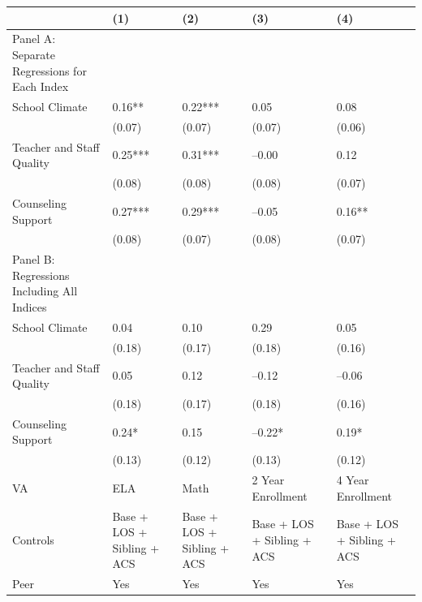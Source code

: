 \documentclass{article}
\begin{document}
\begin{table}[tbp] \centering
{}

{\footnotesize
\begin{tabularx}{\linewidth}{lCCCC}

\toprule
&{(1)}&{(2)}&{(3)}&{(4)} \tabularnewline
\midrule \addlinespace[\belowrulesep]
Panel A: Separate Regressions for Each Index&&&& \tabularnewline
\midrule School Climate&0.16**&0.22***&0.05&0.08 \tabularnewline
&(0.07)&(0.07)&(0.07)&(0.06) \tabularnewline
Teacher and Staff Quality&0.25***&0.31***&--0.00&0.12 \tabularnewline
&(0.08)&(0.08)&(0.08)&(0.07) \tabularnewline
Counseling Support&0.27***&0.29***&--0.05&0.16** \tabularnewline
&(0.08)&(0.07)&(0.08)&(0.07) \tabularnewline
\midrule \midrule Panel B: Regressions Including All Indices&&&& \tabularnewline
\midrule School Climate&0.04&0.10&0.29&0.05 \tabularnewline
&(0.18)&(0.17)&(0.18)&(0.16) \tabularnewline
Teacher and Staff Quality&0.05&0.12&--0.12&--0.06 \tabularnewline
&(0.18)&(0.17)&(0.18)&(0.16) \tabularnewline
Counseling Support&0.24*&0.15&--0.22*&0.19* \tabularnewline
&(0.13)&(0.12)&(0.13)&(0.12) \tabularnewline
\midrule VA&ELA&Math&2 Year Enrollment&4 Year Enrollment \tabularnewline
Controls&Base + LOS + Sibling + ACS&Base + LOS + Sibling + ACS&Base + LOS + Sibling + ACS&Base + LOS + Sibling + ACS \tabularnewline
Peer&Yes&Yes&Yes&Yes \tabularnewline
\bottomrule 

\end{tabularx}
}
\end{table}
\end{document}
